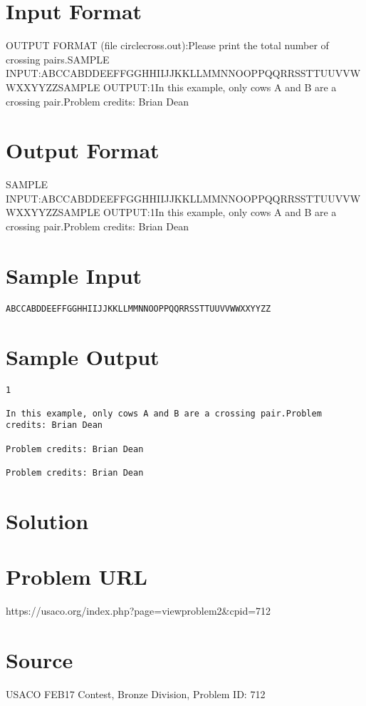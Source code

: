\documentclass[12pt]{article}
\begin{document}
\section*{Input Format}
OUTPUT FORMAT (file circlecross.out):Please print the total number of crossing pairs.SAMPLE INPUT:ABCCABDDEEFFGGHHIIJJKKLLMMNNOOPPQQRRSSTTUUVVWWXXYYZZSAMPLE OUTPUT:1In this example, only cows A and B are a crossing pair.Problem credits: Brian Dean

\section*{Output Format}
SAMPLE INPUT:ABCCABDDEEFFGGHHIIJJKKLLMMNNOOPPQQRRSSTTUUVVWWXXYYZZSAMPLE OUTPUT:1In this example, only cows A and B are a crossing pair.Problem credits: Brian Dean

\section*{Sample Input}
\begin{verbatim}
ABCCABDDEEFFGGHHIIJJKKLLMMNNOOPPQQRRSSTTUUVVWWXXYYZZ
\end{verbatim}

\section*{Sample Output}
\begin{verbatim}
1

In this example, only cows A and B are a crossing pair.Problem credits: Brian Dean

Problem credits: Brian Dean

Problem credits: Brian Dean
\end{verbatim}

\section*{Solution}


\section*{Problem URL}
https://usaco.org/index.php?page=viewproblem2&cpid=712

\section*{Source}
USACO FEB17 Contest, Bronze Division, Problem ID: 712
\end{document}
